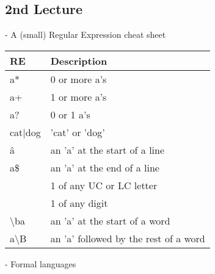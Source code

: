 \documentclass[11pt]{article}
\begin{document}
\subsection{2nd Lecture}
- A (small) Regular Expression cheat sheet
\begin{center}
\begin{tabular}{|l|l|}\hline
RE & Description\\\hline
a* & 0 or more a's\\\hline
a+ & 1 or more a's\\\hline
a? & 0 or 1 a's\\\hline
cat|dog & 'cat' or 'dog'\\\hline
\^a & an 'a' at the start of a line\\\hline
a\$ & an 'a' at the end of a line\\\hline
[a-zA-Z] & 1 of any UC or LC letter\\\hline
[0-9] & 1 of any digit\\\hline
\textbackslash ba & an 'a' at the start of a word\\\hline
a\textbackslash B & an 'a' followed by the rest of a word\\\hline
\end{tabular}
\end{center}
- Formal languages
\end{document}
